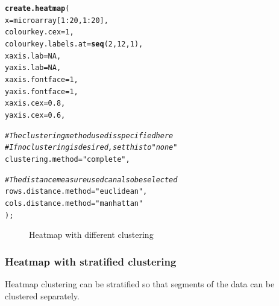 \documentclass[letterpaper]{article}\usepackage[]{graphicx}\usepackage[]{color}
\makeatletter
\newcommand{\hlnum}[1]{\textcolor[rgb]{0.686,0.059,0.569}{#1}}%
\newcommand{\hlstr}[1]{\textcolor[rgb]{0.192,0.494,0.8}{#1}}%
\newcommand{\hlcom}[1]{\textcolor[rgb]{0.678,0.584,0.686}{\textit{#1}}}%
\newcommand{\hlopt}[1]{\textcolor[rgb]{0,0,0}{#1}}%
\newcommand{\hlstd}[1]{\textcolor[rgb]{0.345,0.345,0.345}{#1}}%
\newcommand{\hlkwc}[1]{\textcolor[rgb]{0.333,0.667,0.333}{#1}}%
\newcommand{\hlkwd}[1]{\textcolor[rgb]{0.737,0.353,0.396}{\textbf{#1}}}%
\newenvironment{kframe}{%
 \def\at@end@of@kframe{}%
 \ifinner\ifhmode%
  \def\at@end@of@kframe{\end{minipage}}%
  \begin{minipage}{\columnwidth}%
 \fi\fi%
 \def\FrameCommand##1{\hskip\@totalleftmargin \hskip-\fboxsep
 \colorbox{shadecolor}{##1}\hskip-\fboxsep
     \hskip-\linewidth \hskip-\@totalleftmargin \hskip\columnwidth}%
 \MakeFramed {\advance\hsize-\width
   \@totalleftmargin\z@ \linewidth\hsize
   \@setminipage}}%
 {\par\unskip\endMakeFramed%
 \at@end@of@kframe}
\newenvironment{knitrout}{}{} %
\makeatother
\begin{document}
\begin{knitrout}
\color{fgcolor}\begin{kframe}
\begin{alltt}
\hlkwd{create.heatmap}\hlstd{(}
    \hlkwc{x} \hlstd{= microarray[}\hlnum{1}\hlopt{:}\hlnum{20}\hlstd{,} \hlnum{1}\hlopt{:}\hlnum{20}\hlstd{],}
    \hlkwc{colourkey.cex} \hlstd{=} \hlnum{1}\hlstd{,}
    \hlkwc{colourkey.labels.at} \hlstd{=} \hlkwd{seq}\hlstd{(}\hlnum{2}\hlstd{,} \hlnum{12}\hlstd{,} \hlnum{1}\hlstd{),}
    \hlkwc{xaxis.lab} \hlstd{=} \hlnum{NA}\hlstd{,}
    \hlkwc{yaxis.lab} \hlstd{=} \hlnum{NA}\hlstd{,}
    \hlkwc{xaxis.fontface} \hlstd{=} \hlnum{1}\hlstd{,}
    \hlkwc{yaxis.fontface} \hlstd{=} \hlnum{1}\hlstd{,}
    \hlkwc{xaxis.cex} \hlstd{=} \hlnum{0.8}\hlstd{,}
    \hlkwc{yaxis.cex} \hlstd{=} \hlnum{0.6}\hlstd{,}

    \hlcom{# The clustering method used is specified here}
    \hlcom{# If no clustering is desired, set this to "none"}
    \hlkwc{clustering.method} \hlstd{=} \hlstr{"complete"}\hlstd{,}

    \hlcom{# The distance measure used can also be selected}
    \hlkwc{rows.distance.method} \hlstd{=} \hlstr{"euclidean"}\hlstd{,}
    \hlkwc{cols.distance.method} \hlstd{=} \hlstr{"manhattan"}
    \hlstd{);}
\end{alltt}
\end{kframe}\begin{figure}[]


{\centering {} 

}

\caption[Heatmap with different clustering]{Heatmap with different clustering\label{fig:heatmap3}}
\end{figure}


\end{knitrout}

\subsubsection{Heatmap with stratified clustering}
Heatmap clustering can be stratified so that segments of the data can be clustered separately.
\end{document}

